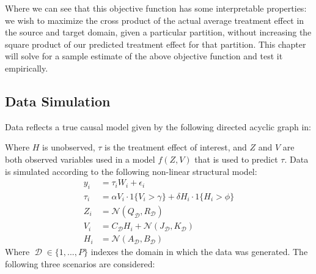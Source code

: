 \documentclass[a4paper,12pt]{article}
\DeclareMathOperator*{\D}{\mathcal{D}}
\begin{document}
Where we can see that this objective function has some interpretable properties: we wish to maximize the cross product of the actual average treatment effect in the source and target domain, given a particular partition, without increasing the square product of our predicted treatment effect for that partition. This chapter will solve for a sample estimate of the above objective function and test it empirically.

\subsection{ Data Simulation }

Data reflects a true causal model given by the following directed acyclic graph in:

\vspace{5mm}
\vspace{5mm}

Where $H$ is unobserved, $\tau$ is the treatment effect of interest, and $Z$ and $V$ are both observed variables used in a model $f(Z, V)$ that is used to predict $\tau$.
%
Data is simulated according to the following non-linear structural model:
%
\begin{align*}
y_i &= \tau_i W_i + \epsilon_i \\
\tau_i &= \alpha V_i \cdot  1 \{ V_i > \gamma \} + \delta H_i \cdot  1 \{ H_i > \phi \}\\
Z_i &= \mathcal{N}(Q_{\D}, R_{\D}) \\
V_i &= C_{\D} H_i + \mathcal{N}(J_{\D}, K_{\D}) \\
H_i &= \mathcal{N}(A_{\D}, B_{\D})
\end{align*}
%
Where $\D \in \{1,...,P\}$ indexes the domain in which the data was generated. The following three scenarios are considered:
\end{document}

